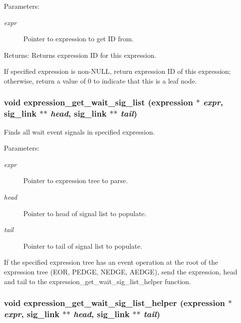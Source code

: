 \begin{Desc}
\item[Parameters:]
\begin{description}
\item[{\em expr}]Pointer to expression to get ID from. \end{description}
\end{Desc}
\begin{Desc}
\item[Returns:]Returns expression ID for this expression.\end{Desc}
If specified expression is non-NULL, return expression ID of this expression; otherwise, return a value of 0 to indicate that this is a leaf node. 
\subsubsection{\setlength{\rightskip}{0pt plus 5cm}void expression\_\-get\_\-wait\_\-sig\_\-list ({\bf expression} $\ast$ {\em expr}, {\bf sig\_\-link} $\ast$$\ast$ {\em head}, {\bf sig\_\-link} $\ast$$\ast$ {\em tail})}\label{expr_8c_a16}


Finds all wait event signals in specified expression. 

\begin{Desc}
\item[Parameters:]
\begin{description}
\item[{\em expr}]Pointer to expression tree to parse. \item[{\em head}]Pointer to head of signal list to populate. \item[{\em tail}]Pointer to tail of signal list to populate.\end{description}
\end{Desc}
If the specified expression tree has an event operation at the root of the expression tree (EOR, PEDGE, NEDGE, AEDGE), send the expression, head and tail to the expression\_\-get\_\-wait\_\-sig\_\-list\_\-helper function. 
\subsubsection{\setlength{\rightskip}{0pt plus 5cm}void expression\_\-get\_\-wait\_\-sig\_\-list\_\-helper ({\bf expression} $\ast$ {\em expr}, {\bf sig\_\-link} $\ast$$\ast$ {\em head}, {\bf sig\_\-link} $\ast$$\ast$ {\em tail})}\label{expr_8c_a15}


